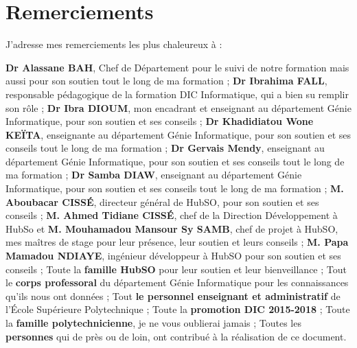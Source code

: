 %
%

\chapter*{Remerciements}
J’adresse mes remerciements les plus chaleureux à : \\
\begin{itemize}
	\itemcheck \textbf{Dr Alassane BAH}, Chef de Département pour le suivi de notre formation mais aussi pour son soutien tout le long de ma formation ;
	\itemcheck \textbf{Dr Ibrahima FALL}, responsable pédagogique de la formation DIC Informatique, qui a bien su remplir son rôle ;
	\itemcheck \textbf{Dr Ibra DIOUM}, mon encadrant et enseignant au département Génie Informatique, pour son soutien et ses conseils ;
	\itemcheck \textbf{Dr Khadidiatou Wone KEÏTA}, enseignante au département Génie Informatique, pour son soutien et
	ses conseils tout le long de ma formation ;
	\itemcheck \textbf{Dr Gervais Mendy}, enseignant au département Génie Informatique, pour son soutien et
	ses conseils tout le long de ma formation ;
	\itemcheck \textbf{Dr Samba DIAW}, enseignant au département Génie Informatique, pour son soutien et
	ses conseils tout le long de ma formation ;
	\itemcheck \textbf{M. Aboubacar CISSÉ}, directeur général de HubSO, pour son soutien et ses conseils ;
	\itemcheck \textbf{M. Ahmed Tidiane CISSÉ}, chef de la Direction Développement à HubSo et \textbf{M. Mouhamadou Mansour Sy SAMB}, chef de projet à HubSO, mes maîtres de stage pour leur présence, leur soutien et leurs conseils ;
	\itemcheck \textbf{M. Papa Mamadou NDIAYE}, ingénieur développeur à HubSO pour son soutien et ses conseils ;
	\itemcheck Toute la \textbf{famille HubSO} pour leur soutien et leur bienveillance ;
	\itemcheck Tout le \textbf{corps professoral} du département Génie Informatique pour les connaissances qu’ils nous ont données ;
	\itemcheck Tout \textbf{le personnel enseignant et administratif} de l’École Supérieure Polytechnique ;
	\itemcheck Toute la \textbf{promotion DIC 2015-2018} ;
	\itemcheck Toute la \textbf{famille polytechnicienne}, je ne vous oublierai jamais ;
	\itemcheck Toutes les \textbf{personnes} qui de près ou de loin, ont contribué à la réalisation de ce document.
\end{itemize}

\clearpage